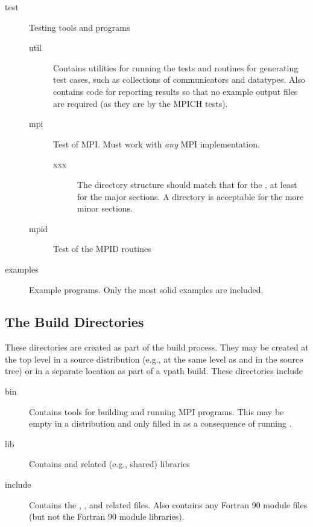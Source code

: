 \documentclass{article}
\begin{document}
\begin{description}
\item[test]Testing tools and programs
  \begin{description}
    \item[util]Contains utilities for running the tests and routines
for generating test cases, such as collections of communicators and
datatypes.  Also contains code for reporting results so that no
example output files are required (as they are by the MPICH tests).
    \item[mpi]Test of MPI.  Must work with \emph{any} MPI implementation.
      \begin{description}
        \item[xxx]The directory structure should match that for the
          , at least for the major sections.  A 
          directory is acceptable for the more minor sections.
      \end{description}
    \item[mpid]Test of the MPID routines
  \end{description}
\item[examples]Example programs.  Only the most solid examples are included.
\end{description}

\subsection{The Build Directories}
These directories are created as part of the build process.  They may
be created at the top level in a source distribution (e.g., at the
same level as  and  in the source tree) or in a
separate location as part of a vpath build.
These directories include
\begin{description}
\item[bin]Contains tools for building and running MPI programs.  This may be
  empty in a distribution and only filled in as a consequence of running
  .
\item[lib]Contains  and related (e.g., shared)
libraries
\item[include]Contains the , , and related
files.  Also contains any Fortran 90 module files (but not the Fortran
90 module libraries).
\end{description}
\end{document}

